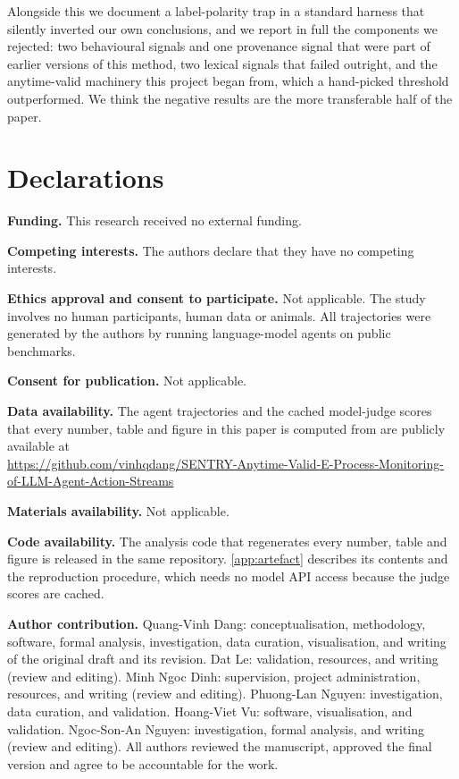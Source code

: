 \documentclass[pdflatex,sn-basic]{sn-jnl}%
\theoremstyle{thmstyleone}
\theoremstyle{thmstyletwo}
\theoremstyle{thmstylethree}
\begin{document}
Alongside this we document a label-polarity trap in a standard harness that
silently inverted our own conclusions, and we report in full the components we
rejected: two behavioural signals and one provenance signal that were part of
earlier versions of this method, two lexical signals that failed outright, and the
anytime-valid machinery this project began from, which a hand-picked threshold
outperformed. We think the negative results are the more
transferable half of the paper.

\section*{Declarations}

\noindent\textbf{Funding.} This research received no external funding.

\smallskip
\noindent\textbf{Competing interests.} The authors declare that they have no
competing interests.

\smallskip
\noindent\textbf{Ethics approval and consent to participate.} Not applicable. The
study involves no human participants, human data or animals. All trajectories were
generated by the authors by running language-model agents on public benchmarks.

\smallskip
\noindent\textbf{Consent for publication.} Not applicable.

\smallskip
\noindent\textbf{Data availability.} The agent trajectories and the cached
model-judge scores that every number, table and figure in this paper is computed
from are publicly available at\\
\url{https://github.com/vinhqdang/SENTRY-Anytime-Valid-E-Process-Monitoring-of-LLM-Agent-Action-Streams}

\smallskip
\noindent\textbf{Materials availability.} Not applicable.

\smallskip
\noindent\textbf{Code availability.} The analysis code that regenerates every
number, table and figure is released in the same repository.
\ref{app:artefact} describes its contents and the reproduction procedure, which
needs no model API access because the judge scores are cached.

\smallskip
\noindent\textbf{Author contribution.} Quang-Vinh Dang: conceptualisation,
methodology, software, formal analysis, investigation, data curation,
visualisation, and writing of the original draft and its revision. Dat Le:
validation, resources, and writing (review and editing). Minh Ngoc Dinh:
supervision, project administration, resources, and writing (review and editing).
Phuong-Lan Nguyen: investigation, data curation, and validation. Hoang-Viet Vu:
software, visualisation, and validation. Ngoc-Son-An Nguyen: investigation, formal
analysis, and writing (review and editing). All authors reviewed the manuscript,
approved the final version and agree to be accountable for the work.
\end{document}
